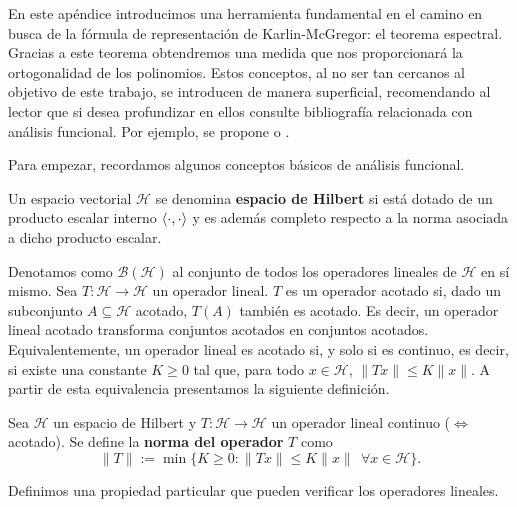 
    
    En este apéndice introducimos una herramienta fundamental en el camino en busca de la fórmula de representación de Karlin-McGregor: el teorema espectral. Gracias a este teorema obtendremos una medida que nos proporcionará la ortogonalidad de los polinomios. Estos conceptos, al no ser tan cercanos al objetivo de este trabajo, se introducen de manera superficial, recomendando al lector que si desea profundizar en ellos consulte bibliografía relacionada con análisis funcional. Por ejemplo, se propone \cite[Ch. I]{Manuel} o \cite[Ch. XII]{rudin}.
    
    Para empezar, recordamos algunos conceptos básicos de análisis funcional.

    \begin{definicion}
        Un espacio vectorial $\mathcal{H}$ se denomina \textbf{espacio de Hilbert} si está dotado de un producto escalar interno $\left\langle \cdot , \cdot \right\rangle$ y es además completo respecto a la norma asociada a dicho producto escalar.
    \end{definicion}

    Denotamos como $\mathcal{B}(\mathcal{H})$ al conjunto de todos los operadores lineales de $\mathcal{H}$ en sí mismo. Sea $T:\mathcal H \longrightarrow \mathcal{H}$ un operador lineal. $T$ es un operador acotado si, dado un subconjunto $A\subseteq \mathcal{H}$ acotado, $T(A)$ también es acotado. Es decir, un operador lineal acotado transforma conjuntos acotados en conjuntos acotados. Equivalentemente, un operador lineal es acotado si, y solo si es continuo, es decir, si existe una constante $K\geq 0$ tal que, para todo $x\in\mathcal H$, $\|Tx\|\leq K\|x\|$. A partir de esta equivalencia presentamos la siguiente definición.

    \begin{definicion}
        Sea $\mathcal{H}$ un espacio de Hilbert y $T:\mathcal H \longrightarrow \mathcal{H}$ un operador lineal continuo ($\Leftrightarrow$ acotado). Se define la \textbf{norma del operador} $T$ como
        \begin{equation}
            \label{eq:norma-operadores}
            \|T\|:= \min\{K\geq 0: \|Tx\|\leq K\|x\| \ \ \forall x\in \mathcal{H}\}.
        \end{equation}
    \end{definicion}

    Definimos una propiedad particular que pueden verificar los operadores lineales.

